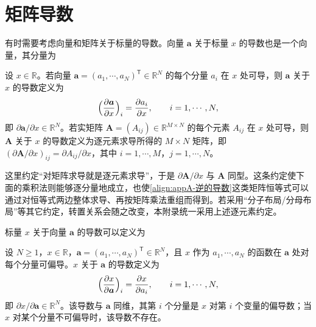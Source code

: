 \documentclass[../main.tex]{subfiles}
\begin{document}
\section{矩阵导数}\label{section:appA-矩阵导数}

有时需要考虑向量和矩阵关于标量的导数。向量 $\bm{a}$ 关于标量 $x$ 的导数也是一个向量，其分量为
\begin{definition}[向量与矩阵关于标量的导数]\label{definition:appA-标量导数}
设 $x\in\mathbb{R}$。若向量 $\bm{a}=(a_1,\cdots,a_N)^{\mathsf{T}}\in\mathbb{R}^{N}$ 的每个分量 $a_i$ 在 $x$ 处可导，则 $\bm{a}$ 关于 $x$ 的导数定义为
\begin{align}
  \Bigl(\frac{\partial\bm{a}}{\partial x}\Bigr)_i=\frac{\partial a_i}{\partial x},\qquad i=1,\cdots,N,
  \label{align:appA-向量导数}
\end{align}
即 $\partial\bm{a}/\partial x\in\mathbb{R}^{N}$。若实矩阵 $\bm{A}=(A_{ij})\in\mathbb{R}^{M\times N}$ 的每个元素 $A_{ij}$ 在 $x$ 处可导，则 $\bm{A}$ 关于 $x$ 的导数定义为逐元素求导所得的 $M\times N$ 矩阵，即 $(\partial\bm{A}/\partial x)_{ij}=\partial A_{ij}/\partial x$，其中 $i=1,\cdots,M$，$j=1,\cdots,N$。
\end{definition}

\begin{remark}
这里约定“对矩阵求导就是逐元素求导”，于是 $\partial\bm{A}/\partial x$ 与 $\bm{A}$ 同型。这条约定使下面的乘积法则能够逐分量地成立，也使\eqref{align:appA-逆的导数}这类矩阵恒等式可以通过对恒等式两边整体求导、再按矩阵乘法重组而得到。若采用“分子布局/分母布局”等其它约定，转置关系会随之改变，本附录统一采用上述逐元素约定。
\end{remark}

标量 $x$ 关于向量 $\bm{a}$ 的导数可以定义为
\begin{definition}[标量关于向量的导数]\label{definition:appA-标量对向量导数}
设 $N\geqslant1$，$x\in\mathbb{R}$，$\bm{a}=(a_1,\cdots,a_N)^{\mathsf{T}}\in\mathbb{R}^{N}$，且 $x$ 作为 $a_1,\cdots,a_N$ 的函数在 $\bm{a}$ 处对每个分量可偏导。$x$ 关于 $\bm{a}$ 的导数定义为
\begin{align}
  \Bigl(\frac{\partial x}{\partial\bm{a}}\Bigr)_i=\frac{\partial x}{\partial a_i},\qquad i=1,\cdots,N,
  \label{align:appA-标量对向量导数}
\end{align}
即 $\partial x/\partial\bm{a}\in\mathbb{R}^{N}$。该导数与 $\bm{a}$ 同维，其第 $i$ 个分量是 $x$ 对第 $i$ 个变量的偏导数；当 $x$ 对某个分量不可偏导时，该导数不存在。
\end{definition}
\end{document}
